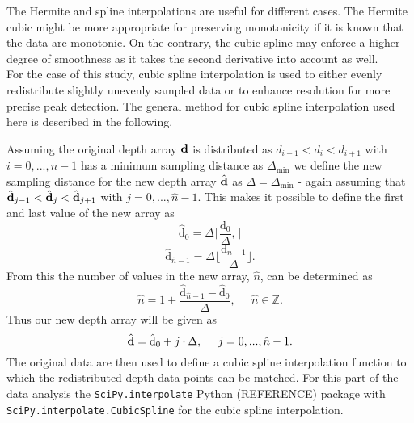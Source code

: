 \documentclass[../../CompleteThesis/Complete_1stDraft.tex]{subfiles}
\begin{document}
The Hermite and spline interpolations are useful for different cases. The Hermite cubic might be more appropriate for preserving monotonicity if it is known that the data are monotonic. On the contrary, the cubic spline may enforce a higher degree of smoothness as it takes the second derivative into account as well.\\
For the case of this study, cubic spline interpolation is used to either evenly redistribute slightly unevenly sampled data or to enhance resolution for more precise peak detection. The general method for cubic spline interpolation used here is described in the following.

Assuming the original depth array $\text{\textbf{d}}$ is distributed as $d_{i-1} < d_i < d_{i+1}$ with $i = 0, ..., n-1$ has a minimum sampling distance as $\Delta_{\text{min}}$ we define the new sampling distance for the new depth array $\hat{\text{\textbf{d}}}$ as $\Delta =\Delta_{\text{min}}$ - again assuming that $\hat{\text{\textbf{d}}}_{j-1} < \hat{\text{\textbf{d}}}_j < \hat{\text{\textbf{d}}}_{j+1}$ with $j = 0, ..., \hat{n}-1$. This makes it possible to define the first and last value of the new array as
\begin{equation}
	\hat{\text{d}}_0 = \Delta \lceil \frac{\text{d}_0}{\Delta}, \rceil 
	\label{Eq:InterpDepthMin}
\end{equation}
\begin{equation}
	\hat{\text{d}}_{\hat{n}-1} = \Delta \lfloor \frac{\text{d}_{n-1}}{\Delta} \rfloor.
	\label{Eq:InterpDepthMax}
\end{equation}
From this the number of values in the new array, $\hat{n}$, can be determined as
\begin{equation}
	\hat{n} = 1 +  \frac{\hat{\text{d}}_{\hat{n}-1} - \hat{\text{d}}_0}{\Delta},\;\;\;\;\; \hat{n} \in\mathbb{Z}.
\end{equation}
Thus our new depth array will be given as
\begin{equation}
	\hat{\text{\textbf{d}}} = \hat{\text{d}}_0 + j\cdot\Delta,\;\;\;\;\; j = 0, ..., \hat{n}-1.
\end{equation}
The original data are then used to define a cubic spline interpolation function to which the redistributed depth data points can be matched. For this part of the data analysis the \lstinline[columns=fixed]|SciPy.interpolate| Python (REFERENCE) package with \lstinline[columns=fixed]|SciPy.interpolate.CubicSpline| for the cubic spline interpolation.
\end{document}
